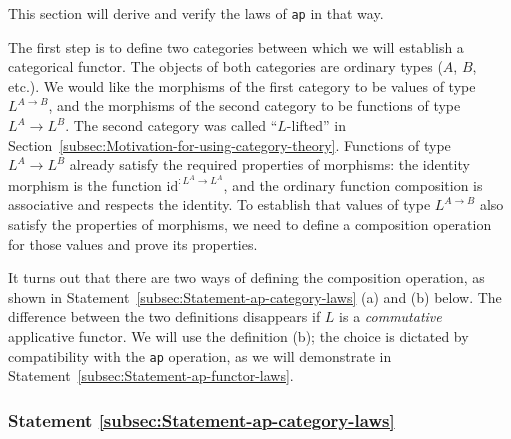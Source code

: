This section will derive and verify the laws of \lstinline!ap! in
that way.

The first step is to define two categories between which we will establish
a categorical functor. The objects of both categories are ordinary
types ($A$, $B$, etc.). We would like the morphisms of the first
category to be values of type $L^{A\rightarrow B}$, and the morphisms
of the second category to be functions of type $L^{A}\rightarrow L^{B}$.
The second category was called \textsf{``}$L$-lifted\textsf{''} in Section~\ref{subsec:Motivation-for-using-category-theory}.
Functions of type $L^{A}\rightarrow L^{B}$ already satisfy the required
properties of morphisms: the identity morphism is the function $\text{id}^{:L^{A}\rightarrow L^{A}}$,
and the ordinary function composition is associative and respects
the identity. To establish that values of type $L^{A\rightarrow B}$
also satisfy the properties of morphisms, we need to define a composition
operation for those values and prove its properties.

It turns out that there are two ways of defining the composition operation,
as shown in Statement~\ref{subsec:Statement-ap-category-laws} (a)
and (b) below. The difference between the two definitions disappears
if $L$ is a \emph{commutative} applicative functor. We will use the
definition (b); the choice is dictated by compatibility with the \lstinline!ap!
operation, as we will demonstrate in Statement~\ref{subsec:Statement-ap-functor-laws}.

\subsubsection{Statement \label{subsec:Statement-ap-category-laws}\ref{subsec:Statement-ap-category-laws}}


